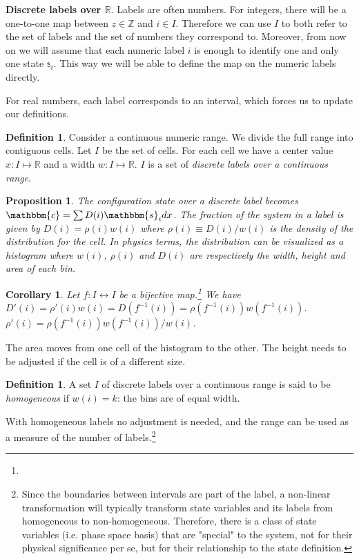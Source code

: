 \documentclass[aps,pra,10pt,twocolumn,floatfix,nofootinbib]{revtex4-1}
\newtheorem{cor}[thm]{Corollary}
\newtheorem{prop}[thm]{Proposition}
\theoremstyle{definition}
\newtheorem{defn}[thm]{Definition}
\begin{document}
\textbf{Discrete labels over $\mathbb{R}$}. Labels are often numbers. For integers, there will be a one-to-one map between $z\in\mathbb{Z}$ and $i\in I$. Therefore we can use $I$ to both refer to the set of labels and the set of numbers they correspond to. Moreover, from now on we will assume that each numeric label $i$ is enough to identify one and only one state $\mathbb{s}_i$. This way we will be able to define the map on the numeric labels directly.

For real numbers, each label corresponds to an interval, which forces us to update our definitions.

\begin{defn}\label{discreteLabelDef}
Consider a continuous numeric range. We divide the full range into contiguous cells. Let $I$ be the set of cells. For each cell we have a center value $x: I \mapsto \mathbb{R}$ and a width $w: I \mapsto \mathbb{R}$. $I$ is a set of \emph{discrete labels over a continuous range}.
\end{defn}

\begin{prop}\label{discreteLabelDist}
The configuration state over a discrete label becomes $\mathbbm{c}=\sum D(i) \mathbbm{s}_i dx$. The fraction of the system in a label is given by $D(i)=\rho(i) w(i)$ where $\rho(i)\equiv D(i) / w(i)$ is the density of the distribution for the cell. In physics terms, the distribution can be visualized as a histogram where $w(i)$, $\rho(i)$ and $D(i)$ are respectively the width, height and area of each bin.
\end{prop}

\begin{cor}\label{discreteLabelEv}
Let $f: I \leftrightarrow I$ be a bijective map.\footnote{} We have $D'(i) = \rho'(i) w(i) = D(f^{-1}(i)) = \rho(f^{-1}(i)) w(f^{-1}(i))$. $\rho'(i) = \rho(f^{-1}(i)) w(f^{-1}(i)) / w(i)$.
\end{cor}

The area moves from one cell of the histogram to the other. The height needs to be adjusted if the cell is of a different size.

\begin{defn}\label{discreteLabelHomogeneous}
A set $I$ of discrete labels over a continuous range is said to be \emph{homogeneous} if $w(i)=k$: the bins are of equal width.
\end{defn}

With homogeneous labels no adjustment is needed, and the range can be used as a measure of the number of labels.\footnote{Since the boundaries between intervals are part of the label, a non-linear transformation will typically transform state variables and its labels from homogeneous to non-homogeneous. Therefore, there is a class of state variables (i.e. phase space basis) that are "special" to the system, not for their physical significance per se, but for their relationship to the state definition.}
\end{document}
